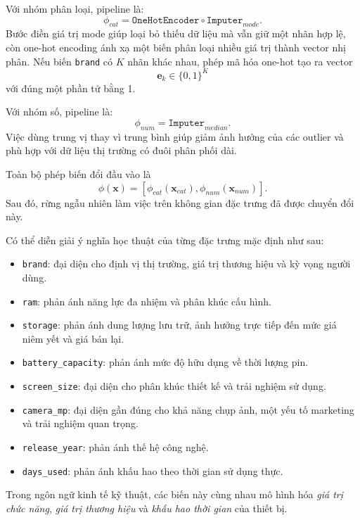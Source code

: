 Với nhóm phân loại, pipeline là:
$$
\phi_{cat} = \texttt{OneHotEncoder} \circ \texttt{Imputer}_{mode}.
$$
Bước điền giá trị mode giúp loại bỏ thiếu dữ liệu mà vẫn giữ một nhãn hợp lệ, còn one-hot encoding ánh xạ một biến phân loại nhiều giá trị thành vector nhị phân. Nếu biến \texttt{brand} có $K$ nhãn khác nhau, phép mã hóa one-hot tạo ra vector
$$
\mathbf{e}_k \in \{0,1\}^K
$$
với đúng một phần tử bằng 1.

Với nhóm số, pipeline là:
$$
\phi_{num} = \texttt{Imputer}_{median}.
$$
Việc dùng trung vị thay vì trung bình giúp giảm ảnh hưởng của các outlier và phù hợp với dữ liệu thị trường có đuôi phân phối dài.

Toàn bộ phép biến đổi đầu vào là
$$
\phi(\mathbf{x}) = [\phi_{cat}(\mathbf{x}_{cat}), \phi_{num}(\mathbf{x}_{num})].
$$
Sau đó, rừng ngẫu nhiên làm việc trên không gian đặc trưng đã được chuyển đổi này.


Có thể diễn giải ý nghĩa học thuật của từng đặc trưng mặc định như sau:

\begin{itemize}
    \item \texttt{brand}: đại diện cho định vị thị trường, giá trị thương hiệu và kỳ vọng người dùng.
    \item \texttt{ram}: phản ánh năng lực đa nhiệm và phân khúc cấu hình.
    \item \texttt{storage}: phản ánh dung lượng lưu trữ, ảnh hưởng trực tiếp đến mức giá niêm yết và giá bán lại.
    \item \texttt{battery\_capacity}: phản ánh mức độ hữu dụng về thời lượng pin.
    \item \texttt{screen\_size}: đại diện cho phân khúc thiết kế và trải nghiệm sử dụng.
    \item \texttt{camera\_mp}: đại diện gần đúng cho khả năng chụp ảnh, một yếu tố marketing và trải nghiệm quan trọng.
    \item \texttt{release\_year}: phản ánh thế hệ công nghệ.
    \item \texttt{days\_used}: phản ánh khấu hao theo thời gian sử dụng thực.
\end{itemize}

Trong ngôn ngữ kinh tế kỹ thuật, các biến này cùng nhau mô hình hóa \textit{giá trị chức năng}, \textit{giá trị thương hiệu} và \textit{khấu hao thời gian} của thiết bị.


